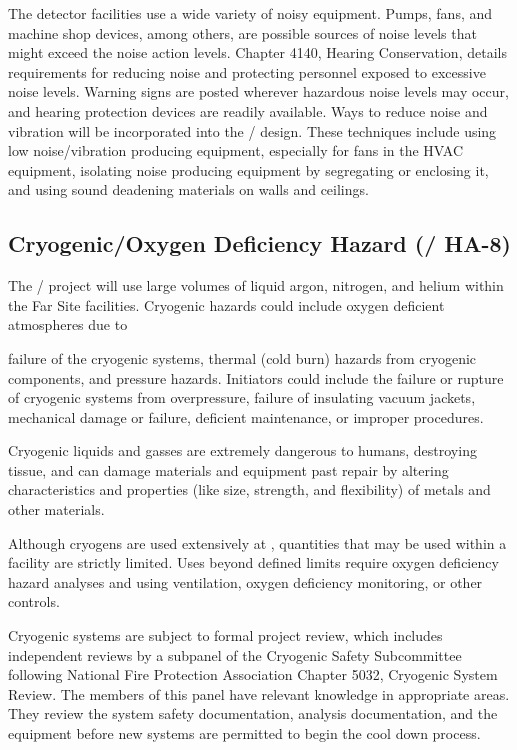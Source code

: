 The detector facilities use a wide variety of noisy equipment. Pumps,
fans, and machine shop devices, among others, are possible sources of
noise levels that might exceed the \fnal noise action levels. 
Chapter 4140, Hearing Conservation, details requirements for reducing
noise and protecting personnel exposed to excessive noise
levels. Warning signs are posted wherever hazardous noise levels may
occur, and hearing protection devices are readily
available. Ways to reduce noise and vibration will be
incorporated into the / design. These techniques include using
low noise/vibration producing equipment, especially for fans in the
HVAC equipment, isolating noise producing equipment by segregating
or enclosing it, and using sound deadening materials on walls and
ceilings.

\subsection{Cryogenic/Oxygen Deficiency Hazard (/ HA-8)}

The / project will use large volumes of liquid
argon, nitrogen, and helium within the Far Site facilities. Cryogenic
hazards could include oxygen deficient atmospheres due to

failure of
the cryogenic systems, thermal (cold burn) hazards from cryogenic
components, and pressure hazards. Initiators could include the failure
or rupture of cryogenic systems from overpressure, failure of
insulating vacuum jackets, mechanical damage or failure, deficient
maintenance, or improper procedures.

Cryogenic liquids and gasses are extremely dangerous to humans,
destroying tissue, and can damage materials and equipment past repair
by altering characteristics and properties (like size, strength, and
flexibility) of metals and other materials.

Although cryogens are used extensively at \fnal, quantities that may be used within a facility are strictly limited. Uses
beyond defined limits require oxygen deficiency hazard 
analyses and using ventilation, oxygen deficiency monitoring, or
other controls.

Cryogenic systems are subject to formal project review, which includes
independent reviews by a subpanel of the Cryogenic Safety Subcommittee
following National Fire Protection Association Chapter 5032, Cryogenic
System Review. The members of this panel have relevant knowledge in
appropriate areas. They review the system safety documentation,
 analysis documentation, and the equipment before new
systems are permitted to begin the cool down process.

